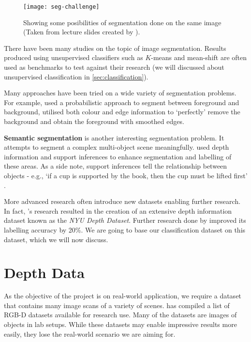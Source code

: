 \begin{figure}[H]
  \centering
  \texttt{[image: seg-challenge]}
  \caption{Showing some posibilities of segmentation done on the same image (Taken from lecture slides created by \protect{}).}
  \label{fig:seg-challenge}
\end{figure}

There have been many studies on the topic of image segmentation. Results produced using unsupervised classifiers such as $K$-means and mean-shift are often used as benchmarks to test against their research (we will discussed about unsupervised classification in \autoref{sec:classification}).

Many approaches have been tried on a wide variety of segmentation problems. For example,  used a probabilistic approach to segment between foreground and background,  utilised both colour and edge information to `perfectly' remove the background and obtain the foreground with smoothed edges. 

\textbf{Semantic segmentation} is another interesting segmentation problem. It attempts to segment a complex multi-object scene meaningfully.  used depth information and support inferences to enhance segmentation and labelling of these areas. As a side note, support inferences tell the relationship between objects - e.g., `if a cup is supported by the book, then the cup must be lifted first' \cite{nyu-dataset}.

More advanced research often introduce new datasets enabling further research. In fact, 's research resulted in the creation of an extensive depth information dataset known as the \textit{NYU Depth Dataset}. Further research done by  improved its labelling accuracy by 20\%. We are going to base our classification dataset on this dataset, which we will now discuss.


\newpage
\section{Depth Data} \label{sec:lit-depth-data}
As the objective of the project is on real-world application, we require a dataset that contains many image scans of a variety of scenes.  has compiled a list of RGB-D datasets available for research use. Many of the datasets are images of objects in lab setups. While these datasets may enable impressive results more easily, they lose the real-world scenario we are aiming for.

